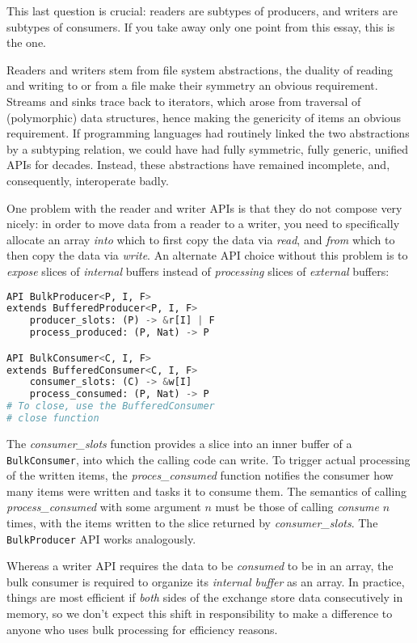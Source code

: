 \documentclass[sigplan,screen,10pt,review]{acmart}
\begin{document}
This last question is crucial: readers are subtypes of producers, and writers are subtypes of consumers. If you take away only one point from this essay, this is the one.

Readers and writers stem from file system abstractions, the duality of reading and writing to or from a file make their symmetry an obvious requirement. Streams and sinks trace back to iterators, which arose from traversal of (polymorphic) data structures, hence making the genericity of items an obvious requirement. If programming languages had routinely linked the two abstractions by a subtyping relation, we could have had fully symmetric, fully generic, unified APIs for decades. Instead, these abstractions have remained incomplete, and, consequently, interoperate badly.

One problem with the reader and writer APIs is that they do not compose very nicely: in order to move data from a reader to a writer, you need to specifically allocate an array \textit{into} which to first copy the data via \textit{read}, and \textit{from} which to then copy the data via \textit{write}. An alternate API choice without this problem is to \textit{expose} slices of \textit{internal} buffers instead of \textit{processing} slices of \textit{external} buffers:

\begin{lstlisting}[language=Python]
API BulkProducer<P, I, F>
extends BufferedProducer<P, I, F>
    producer_slots: (P) -> &r[I] | F
    process_produced: (P, Nat) -> P

API BulkConsumer<C, I, F>
extends BufferedConsumer<C, I, F>
    consumer_slots: (C) -> &w[I]
    process_consumed: (P, Nat) -> P
# To close, use the BufferedConsumer
# close function
\end{lstlisting}

The \textit{consumer\_slots} function provides a slice into an inner buffer of a \texttt{BulkConsumer}, into which the calling code can write. To trigger actual processing of the written items, the \textit{proces\_consumed} function notifies the consumer how many items were written and tasks it to consume them. The semantics of calling \textit{process\_consumed} with some argument $n$ must be those of calling \textit{consume} $n$ times, with the items written to the slice returned by \textit{consumer\_slots}. The \texttt{BulkProducer} API works analogously.

Whereas a writer API requires the data to be \textit{consumed} to be in an array, the bulk consumer is required to organize its \textit{internal buffer} as an array. In practice, things are most efficient if \textit{both} sides of the exchange store data consecutively in memory, so we don't expect this shift in responsibility to make a difference to anyone who uses bulk processing for efficiency reasons.
\end{document}
